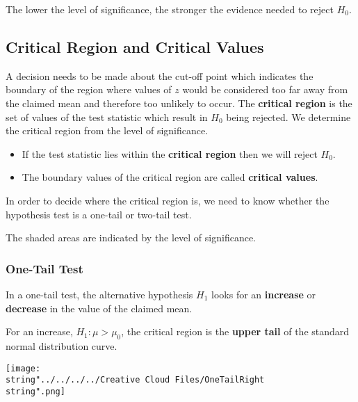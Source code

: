 \documentclass[11pt,a4paper]{book}
\begin{document}
The lower the level of significance, the stronger the evidence needed
to reject $H_{0}$.

\newpage

\subsection{Critical Region and Critical Values}

A decision needs to be made about the cut-off point which indicates
the boundary of the region where values of $z$ would be considered
too far away from the claimed mean and therefore too unlikely to occur.
The \textbf{critical region} is the set of values of the test statistic
which result in $H_{0}$ being rejected. We determine the critical
region from the level of significance.

\begin{tcolorbox}[colback=blue!5, colframe=black, boxrule=.4pt, sharpish corners]

\begin{itemize}
\item If the test statistic lies within the \textbf{critical region} then
we will reject $H_{0}$.
\item The boundary values of the critical region are called \textbf{critical
values}. 
\end{itemize}
\end{tcolorbox}

In order to decide where the critical region is, we need to know whether
the hypothesis test is a one-tail or two-tail test.

The shaded areas are indicated by the level of significance. 

\subsubsection*{One-Tail Test}

In a one-tail test, the alternative hypothesis $H_{1}$ looks for
an \textbf{increase} or \textbf{decrease} in the value of the claimed
mean.

\begin{minipage}[t]{.5\textwidth}

For an increase, $H_{1}:\mu>\mu_{0}$, the critical region is the
\textbf{upper tail} of the standard normal distribution curve.

\end{minipage}
\begin{minipage}[t]{.5\textwidth}
\begin{center}
\texttt{[image: \\string"../../../../Creative Cloud Files/OneTailRight\\string".png]}
\par\end{center}

\end{minipage}
\end{document}
